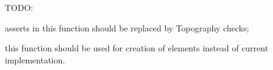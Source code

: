 
\begin{DoxyRefList}
\item[\label{todo__todo000001}%
\hypertarget{todo__todo000001}{}%
Member \hyperlink{classINMOST_1_1Element_a96bd136b0f249c958fc8632553aa3b58}{I\-N\-M\-O\-S\-T\-:\-:Element\-:\-:Connect} (const Handle\-Type $\ast$adjacent, I\-N\-M\-O\-S\-T\-\_\-\-D\-A\-T\-A\-\_\-\-E\-N\-U\-M\-\_\-\-T\-Y\-P\-E num) const ]T\-O\-D\-O\-:
\begin{DoxyEnumerate}
\item asserts in this function should be replaced by Topography checks; \par

\item this function should be used for creation of elements instead of current implementation. \par


\end{DoxyEnumerate}
\end{DoxyRefList}
